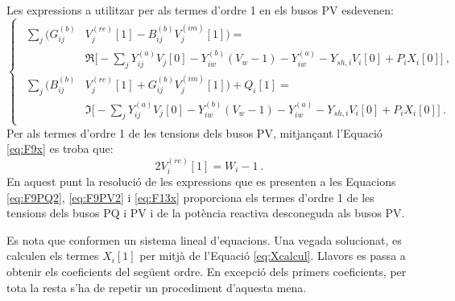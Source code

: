 Les expressions a utilitzar per als termes d'ordre 1 en els busos PV esdevenen:
\begin{equation}
    \begin{cases}
    \begin{split}
    \sum_{j}(G^{(b)}_{ij}&V^{(re)}_j[1]-B^{(b)}_{ij}V^{(im)}_j[1]) =\\
    &\Re\biggl[-\sum_{j}Y^{(a)}_{ij}V_j[0]
    -Y^{(b)}_{iw}(V_w-1)-Y^{(a)}_{iw}-Y_{sh,i}V_i[0]+P_iX_i[0]\biggr]\ ,\\
    \sum_{j}(B^{(b)}_{ij}&V^{(re)}_j[1]+G^{(b)}_{ij}V^{(im)}_j[1])+Q_i[1] =\\
    &\Im\biggl[-\sum_{j}Y^{(a)}_{ij}V_j[0]
     -Y^{(b)}_{iw}(V_w-1)-Y^{(a)}_{iw}-Y_{sh,i}V_i[0]+P_iX_i[0]\biggr]\ .
    \end{split}
\end{cases}
        \label{eq:F9PV2}
\end{equation}
Per als termes d'ordre 1 de les tensions dels busos PV, mitjançant l'Equació \ref{eq:F9x} es troba que:
\begin{equation}
    2V^{(re)}_i[1]=W_i-1\ .
        \label{eq:F13x}
\end{equation}
En aquest punt la resolució de les expressions que es presenten a les Equacions \ref{eq:F9PQ2}, \ref{eq:F9PV2} i \ref{eq:F13x} proporciona els termes d'ordre 1 de les tensions dels busos PQ i PV i de la potència reactiva desconeguda als busos PV. 

Es nota que conformen un sistema lineal d'equacions. Una vegada solucionat, es calculen els termes $X_i[1]$ per mitjà de l'Equació \ref{eq:Xcalcul}. Llavors es passa a obtenir els coeficients del següent ordre. En excepció dels primers coeficients, per tota la resta s'ha de repetir un procediment d'aquesta mena.  

